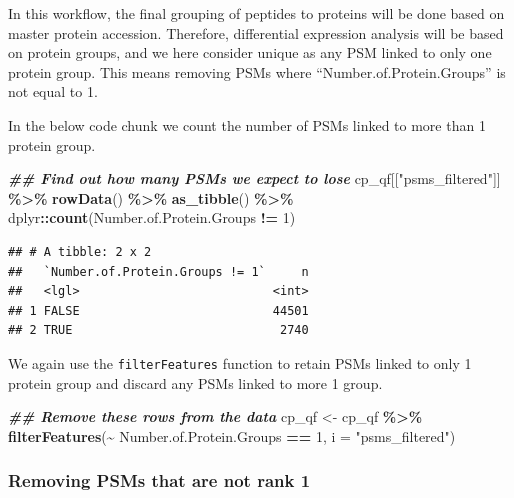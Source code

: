 \documentclass[9pt,a4paper,]{extarticle}
\newenvironment{Shaded}{\begin{snugshade}}{\end{snugshade}}
\newcommand{\AttributeTok}[1]{\textcolor[rgb]{0.13,0.29,0.53}{#1}}
\newcommand{\DecValTok}[1]{\textcolor[rgb]{0.00,0.00,0.81}{#1}}
\newcommand{\DocumentationTok}[1]{\textcolor[rgb]{0.56,0.35,0.01}{\textbf{\textit{#1}}}}
\newcommand{\FunctionTok}[1]{\textcolor[rgb]{0.13,0.29,0.53}{\textbf{#1}}}
\newcommand{\NormalTok}[1]{#1}
\newcommand{\OtherTok}[1]{\textcolor[rgb]{0.56,0.35,0.01}{#1}}
\newcommand{\SpecialCharTok}[1]{\textcolor[rgb]{0.81,0.36,0.00}{\textbf{#1}}}
\newcommand{\StringTok}[1]{\textcolor[rgb]{0.31,0.60,0.02}{#1}}
\begin{document}
In this workflow, the final grouping of peptides to proteins will be done based
on master protein accession. Therefore, differential expression analysis will be
based on protein groups, and we here consider unique as any PSM linked to only
one protein group. This means removing PSMs where ``Number.of.Protein.Groups'' is
not equal to 1.

In the below code chunk we count the number of PSMs linked to more than 1
protein group.

\begin{Shaded}
\begin{Highlighting}[]
\DocumentationTok{\#\# Find out how many PSMs we expect to lose}
\NormalTok{cp\_qf[[}\StringTok{"psms\_filtered"}\NormalTok{]] }\SpecialCharTok{\%\textgreater{}\%} 
  \FunctionTok{rowData}\NormalTok{() }\SpecialCharTok{\%\textgreater{}\%} 
  \FunctionTok{as\_tibble}\NormalTok{() }\SpecialCharTok{\%\textgreater{}\%} 
\NormalTok{  dplyr}\SpecialCharTok{::}\FunctionTok{count}\NormalTok{(Number.of.Protein.Groups }\SpecialCharTok{!=} \DecValTok{1}\NormalTok{)}
\end{Highlighting}
\end{Shaded}

\begin{verbatim}
## # A tibble: 2 x 2
##   `Number.of.Protein.Groups != 1`     n
##   <lgl>                           <int>
## 1 FALSE                           44501
## 2 TRUE                             2740
\end{verbatim}

We again use the \texttt{filterFeatures} function to retain PSMs linked to only
1 protein group and discard any PSMs linked to more 1 group.

\begin{Shaded}
\begin{Highlighting}[]
\DocumentationTok{\#\# Remove these rows from the data}
\NormalTok{cp\_qf }\OtherTok{\textless{}{-}}\NormalTok{ cp\_qf }\SpecialCharTok{\%\textgreater{}\%}
  \FunctionTok{filterFeatures}\NormalTok{(}\SpecialCharTok{\textasciitilde{}}\NormalTok{ Number.of.Protein.Groups }\SpecialCharTok{==} \DecValTok{1}\NormalTok{, }
                 \AttributeTok{i =} \StringTok{"psms\_filtered"}\NormalTok{)}
\end{Highlighting}
\end{Shaded}

\subsubsection{Removing PSMs that are not rank 1}\label{removing-psms-that-are-not-rank-1}
\end{document}
